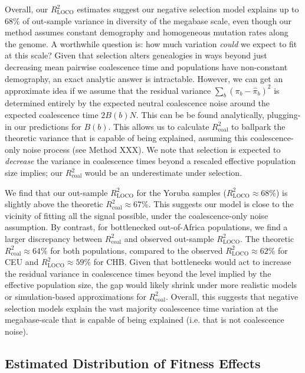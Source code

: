 \documentclass[11pt]{article}
\begin{document}
Overall, our $R_\text{LOCO}^2$ estimates suggest our negative selection model
explains up to 68\% of out-sample variance in diversity of the megabase scale,
even though our method assumes constant demography and homogeneous mutation
rates along the genome. A worthwhile question is: how much variation
\emph{could} we expect to fit at this scale? Given that selection alters
genealogies in ways beyond just decreasing mean pairwise coalescence time and
populations have non-constant demography, an exact analytic answer is
intractable. However, we can get an approximate idea if we assume that the
residual variance $\sum_b (\pi_b - \widehat{\pi}_b)^2$ is determined entirely
by the expected neutral coalescence noise around the expected coalescence time
$2B(b)N$. This can be be found analytically, plugging-in our predictions for
$B(b)$. This allows us to calculate $R_\text{coal}^2$ to ballpark the theoretic
variance that is capable of being explained, assuming this coalescence-only
noise process (see Method XXX). We note that selection is expected to
\emph{decrease} the variance in coalescence times beyond a rescaled effective
population size implies; our $R_\text{coal}^2$ would be an underestimate under
selection.

We find that our out-sample $R_\text{LOCO}^2$ for the Yoruba samples
($R_\text{LOCO}^2 \approx 68$\%) is slightly above the theoretic
$R_\text{coal}^2 \approx 67$\%. This suggests our model is close to the
vicinity of fitting all the signal possible, under the coalescence-only noise
assumption. By contrast, for bottlenecked out-of-Africa populations, we find a
larger discrepancy between $R_\text{coal}^2$ and observed out-sample
$R_\text{LOCO}^2$. The theoretic $R_\text{coal}^2 \approx 64$\% for both
populations, compared to the observed $R_\text{LOCO}^2 \approx 62$\% for CEU
and $R_\text{LOCO}^2 \approx 59$\% for CHB. Given that bottlenecks would act to
increase the residual variance in coalescence times beyond the level implied by
the effective population size, the gap would likely shrink under more realistic
models or simulation-based approximations for $R_\text{coal}^2$. Overall, this
suggests that negative selection models explain the vast majority coalescence
time variation at the megabase-scale that is capable of being explained (i.e.
that is not coalescence noise).

\subsection*{Estimated Distribution of Fitness Effects}
\end{document}
